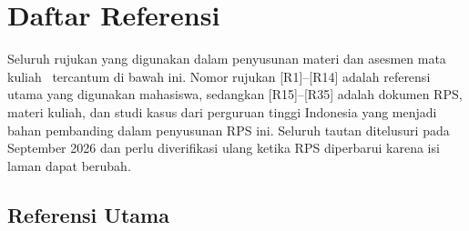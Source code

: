 
\section{Daftar Referensi}
\label{sec:referensi}

Seluruh rujukan yang digunakan dalam penyusunan materi dan asesmen mata kuliah
\NamaMK\ tercantum di bawah ini. Nomor rujukan [R1]--[R14] adalah referensi
utama yang digunakan mahasiswa, sedangkan [R15]--[R35] adalah dokumen RPS,
materi kuliah, dan studi kasus dari perguruan tinggi Indonesia yang menjadi
bahan pembanding dalam penyusunan RPS ini. Seluruh tautan ditelusuri pada
September 2026 dan perlu diverifikasi ulang ketika RPS diperbarui karena isi
laman dapat berubah.

\subsection{Referensi Utama}


